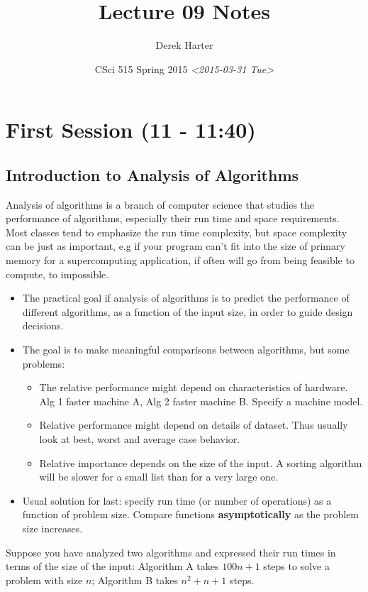 \documentclass[11pt]{article}
\author{Derek Harter}
\date{CSci 515 Spring 2015 \textit{<2015-03-31 Tue>}}
\title{Lecture 09 Notes}
\begin{document}
\maketitle

\section{First Session (11 - 11:40)}
\label{sec-1}
\subsection{Introduction to Analysis of Algorithms}
\label{sec-1-1}
Analysis of algorithms is a branch of computer science that studies
the performance of algorithms, especially their run time and space
requirements.  Most classes tend to emphasize the run time complexity,
but space complexity can be just as important, e.g if your program
can't fit into the size of primary memory for a supercomputing
application, if often will go from being feasible to compute, to
impossible.

\begin{itemize}
\item The practical goal if analysis of algorithms is to predict the
performance of different algorithms, as a function of the input size,
in order to guide design decisions.
\item The goal is to make meaningful comparisons between algorithms, but
some problems:
\begin{itemize}
\item The relative performance might depend on characteristics of hardware.
Alg 1 faster machine A, Alg 2 faster machine B.  Specify a machine model.
\item Relative performance might depend on details of dataset.  Thus usually
look at best, worst and average case behavior.
\item Relative importance depends on the size of the input.  A sorting
algorithm will be slower for a small list than for a very large one.
\end{itemize}
\item Usual solution for last: specify run time (or number of operations)
as a function of problem size.  Compare functions \textbf{asymptotically} 
as the problem size increases.
\end{itemize}

Suppose you have analyzed two algorithms and expressed their run times in
terms of the size of the input: Algorithm A takes $100n + 1$ steps
to solve a problem with size $n$; Algorithm B takes $n^2 + n + 1$ steps.
\end{document}
